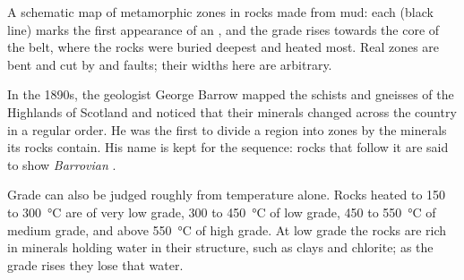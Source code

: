 \begin{omfigure}

{\small A schematic map of metamorphic zones in rocks made from mud: each
 (black line) marks the first appearance of an , and the
grade rises towards the core of the belt, where the rocks were buried deepest
and heated most. Real zones are bent and cut by  and faults; their
widths here are arbitrary.}
\end{omfigure}

\begin{history}
In the 1890s, the geologist George Barrow mapped the schists and gneisses of
the Highlands of Scotland and noticed that their minerals changed across the
country in a regular order. He was the first to divide a region into zones by
the minerals its rocks contain. His name is kept for the sequence: rocks
that follow it are said to show \emph{Barrovian} .
\end{history}

Grade can also be judged roughly from temperature alone. Rocks heated to 150
to \qty{300}{\celsius} are of very low grade, 300 to \qty{450}{\celsius} of
low grade, 450 to \qty{550}{\celsius} of medium grade, and above
\qty{550}{\celsius} of high grade. At low grade the rocks are rich in
minerals holding water in their structure, such as clays and chlorite; as
the grade rises they lose that water.

